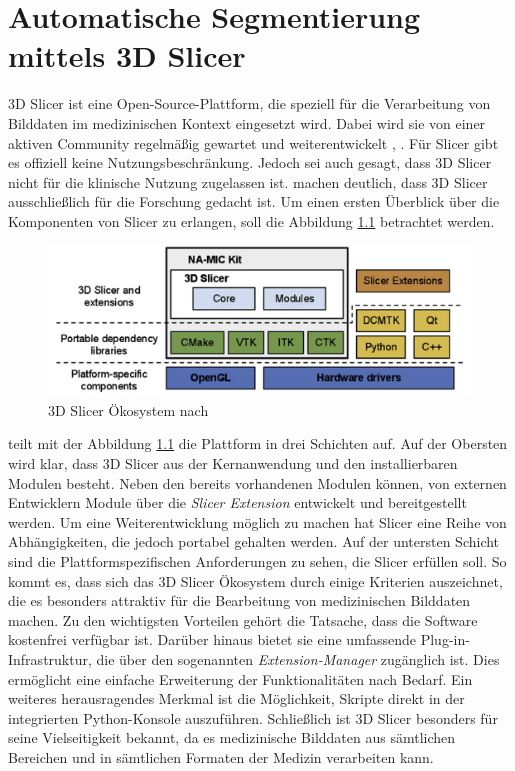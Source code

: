\chapter{Automatische Segmentierung mittels 3D Slicer}
\label{sec:3d_slicer} 3D Slicer ist eine Open-Source-Plattform, die speziell für
die Verarbeitung von Bilddaten im medizinischen Kontext eingesetzt wird. Dabei wird
sie von einer aktiven Community regelmäßig gewartet und weiterentwickelt \citep[vgl.][]{slicer2024},
\citep[vgl.][S.~1325]{fedorov2012slicer}. Für Slicer gibt es offiziell keine Nutzungsbeschränkung.
Jedoch sei auch gesagt, dass 3D Slicer nicht für die klinische Nutzung zugelassen
ist. \citet[S.~1331]{fedorov2012slicer} machen deutlich, dass 3D Slicer
ausschließlich für die Forschung gedacht ist. Um einen ersten Überblick über die
Komponenten von Slicer zu erlangen, soll die Abbildung
\ref{fig:3d_slicer_oekosystem} betrachtet werden.

\begin{figure}[h]
	\centering
	\includegraphics[width=1\textwidth]{img/3d_slicer_overview.jpg}
	\caption{3D Slicer Ökosystem nach \citet[S.~1326]{fedorov2012slicer}}
	\label{fig:3d_slicer_oekosystem}
\end{figure}

\citet[S.~1326]{fedorov2012slicer} teilt mit der Abbildung
\ref{fig:3d_slicer_oekosystem} die Plattform in drei Schichten auf. Auf der Obersten
wird klar, dass 3D Slicer aus der Kernanwendung und den installierbaren Modulen
besteht. Neben den bereits vorhandenen Modulen können, von externen Entwicklern
Module über die \textit{Slicer Extension} entwickelt und bereitgestellt werden.
Um eine Weiterentwicklung möglich zu machen hat Slicer eine Reihe von
Abhängigkeiten, die jedoch portabel gehalten werden. Auf der untersten Schicht
sind die Plattformspezifischen Anforderungen zu sehen, die Slicer erfüllen soll.
So kommt es, dass sich das 3D Slicer Ökosystem durch einige Kriterien auszeichnet,
die es besonders attraktiv für die Bearbeitung von medizinischen Bilddaten
machen. Zu den wichtigsten Vorteilen gehört die Tatsache, dass die Software
kostenfrei verfügbar ist. Darüber hinaus bietet sie eine umfassende Plug-in-Infrastruktur,
die über den sogenannten \textit{Extension-Manager} zugänglich ist. Dies
ermöglicht eine einfache Erweiterung der Funktionalitäten nach Bedarf. Ein weiteres
herausragendes Merkmal ist die Möglichkeit, Skripte direkt in der integrierten
Python-Konsole auszuführen. Schließlich ist 3D Slicer besonders für seine Vielseitigkeit
bekannt, da es medizinische Bilddaten aus sämtlichen Bereichen und in sämtlichen
Formaten der Medizin verarbeiten kann.

